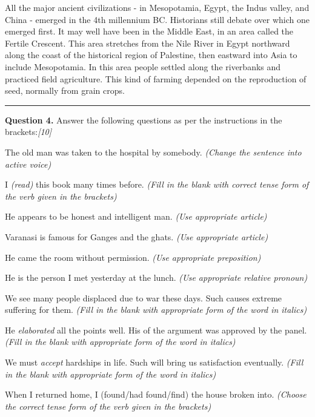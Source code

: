 \documentclass[11pt,a4paper]{article}
\newcommand{\pts}[1]{\hfill   \textit{[#1]}}
\begin{document}
All the major ancient civilizations - in Mesopotamia, Egypt, the Indus valley, and China - emerged in the 4th millennium BC. Historians still debate over which one emerged first. It may well have been in the Middle East, in an area called the Fertile Crescent. This area stretches from the Nile River in Egypt northward along the coast of the historical region of Palestine, then eastward into Asia to include Mesopotamia. In this area people settled along the riverbanks and practiced field agriculture. This kind of farming depended on the reproduction of seed, normally from grain crops.

\medskip\rule{\linewidth}{0.2pt}




\noindent   \textbf{Question 4.}
Answer the following questions as per the instructions in the brackets:\pts{10}

\begin{parts}
  \item The old man was taken to the hospital by somebody.   \textit{(Change the sentence into active voice)}
  \item I \underline{\hspace{3cm}}   \textit{(read)} this book many times before.   \textit{(Fill in the blank with correct tense form of the verb given in the brackets)}
  \item He appears to be \underline{\hspace{2cm}} honest and intelligent man.   \textit{(Use appropriate article)}
  \item Varanasi is famous for \underline{\hspace{2cm}} Ganges and the ghats.   \textit{(Use appropriate article)}
  \item He came \underline{\hspace{2cm}} the room without permission.   \textit{(Use appropriate preposition)}
  \item He is the person \underline{\hspace{2cm}} I met yesterday at the lunch.   \textit{(Use appropriate relative pronoun)}
  \item We see many people displaced due to war these days. Such \underline{\hspace{3cm}} causes extreme suffering for them.   \textit{(Fill in the blank with appropriate form of the word in italics)}
  \item He   \textit{elaborated} all the points well. His \underline{\hspace{3cm}} of the argument was approved by the panel.   \textit{(Fill in the blank with appropriate form of the word in italics)}
  \item We must   \textit{accept} hardships in life. Such \underline{\hspace{3cm}} will bring us satisfaction eventually.   \textit{(Fill in the blank with appropriate form of the word in italics)}
  \item When I returned home, I \underline{\hspace{3cm}} (found/had found/find) the house broken into.   \textit{(Choose the correct tense form of the verb given in the brackets)}
\end{parts}
\end{document}
